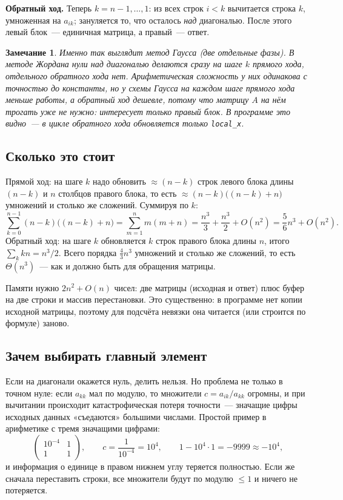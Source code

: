 \documentclass[11pt,a4paper]{report}
\newtheorem{zam}{Замечание}[chapter]
\begin{document}
\textbf{Обратный ход.} Теперь $k=n-1,\dots,1$: из всех строк $i<k$ вычитается
строка $k$, умноженная на $a_{ik}$; зануляется то, что осталось \emph{над}
диагональю. После этого левый блок~--- единичная матрица, а правый~--- ответ.

\begin{zam}
Именно так выглядит метод \emph{Гаусса} (две отдельные фазы). В методе
Жордана нули над диагональю делаются сразу на шаге $k$ прямого хода, отдельного
обратного хода нет. Арифметическая сложность у них одинакова с точностью до
константы, но у схемы Гаусса на каждом шаге прямого хода меньше работы, а
обратный ход дешевле, потому что матрицу $A$ на нём трогать уже не нужно:
интересует только правый блок. В программе это видно~--- в цикле обратного хода
обновляется только \texttt{local\_x}.
\end{zam}

\subsection{Сколько это стоит}

Прямой ход: на шаге $k$ надо обновить $\approx(n-k)$ строк левого блока длины
$(n-k)$ и $n$ столбцов правого блока, то есть $\approx (n-k)\bigl((n-k)+n\bigr)$
умножений и столько же сложений. Суммируя по $k$:
\[
\sum_{k=0}^{n-1}(n-k)\bigl((n-k)+n\bigr)
=\sum_{m=1}^{n} m(m+n)=\frac{n^3}{3}+\frac{n^3}{2}+O(n^2)=\frac{5}{6}n^3+O(n^2).
\]
Обратный ход: на шаге $k$ обновляется $k$ строк правого блока длины $n$, итого
$\sum_k kn = n^3/2$. Всего порядка $\tfrac{4}{3}n^3$ умножений и столько же
сложений, то есть $\Theta(n^3)$~--- как и должно быть для обращения матрицы.

Памяти нужно $2n^2+O(n)$ чисел: две матрицы (исходная и ответ) плюс буфер на две
строки и массив перестановки. Это существенно: в программе нет копии исходной
матрицы, поэтому для подсчёта невязки она читается (или строится по формуле)
заново.

\subsection{Зачем выбирать главный элемент}

Если на диагонали окажется нуль, делить нельзя. Но проблема не только в точном
нуле: если $a_{kk}$ мал по модулю, то множители $c=a_{ik}/a_{kk}$ огромны, и при
вычитании происходит катастрофическая потеря точности~--- значащие цифры
исходных данных «съедаются» большими числами. Простой пример в арифметике с
тремя значащими цифрами:
\[
\begin{pmatrix} 10^{-4} & 1 \\ 1 & 1\end{pmatrix},\qquad
c=\frac{1}{10^{-4}}=10^{4},\qquad
1-10^4\cdot 1=-9999\approx -10^4,
\]
и информация о единице в правом нижнем углу теряется полностью. Если же сначала
переставить строки, все множители будут по модулю $\le 1$ и ничего не потеряется.
\end{document}
